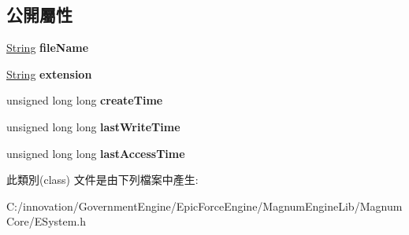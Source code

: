 \subsection*{公開屬性}
\begin{DoxyCompactItemize}
\item 
\hyperlink{class_i_dream_sky_1_1_string}{String} {\bfseries file\+Name}\hypertarget{class_i_dream_sky_1_1_system_1_1_file_a105074aa1f1a9c412714e5215bc9198f}{}\label{class_i_dream_sky_1_1_system_1_1_file_a105074aa1f1a9c412714e5215bc9198f}

\item 
\hyperlink{class_i_dream_sky_1_1_string}{String} {\bfseries extension}\hypertarget{class_i_dream_sky_1_1_system_1_1_file_a75aa8cc608dedfb4275596b81510a7d4}{}\label{class_i_dream_sky_1_1_system_1_1_file_a75aa8cc608dedfb4275596b81510a7d4}

\item 
unsigned long long {\bfseries create\+Time}\hypertarget{class_i_dream_sky_1_1_system_1_1_file_a0817d7e41722888abd6c15523970b580}{}\label{class_i_dream_sky_1_1_system_1_1_file_a0817d7e41722888abd6c15523970b580}

\item 
unsigned long long {\bfseries last\+Write\+Time}\hypertarget{class_i_dream_sky_1_1_system_1_1_file_a420ee50ae76893c08cb55af06aa2ea60}{}\label{class_i_dream_sky_1_1_system_1_1_file_a420ee50ae76893c08cb55af06aa2ea60}

\item 
unsigned long long {\bfseries last\+Access\+Time}\hypertarget{class_i_dream_sky_1_1_system_1_1_file_a43ec92674cae4a70167c42fe98910caa}{}\label{class_i_dream_sky_1_1_system_1_1_file_a43ec92674cae4a70167c42fe98910caa}

\end{DoxyCompactItemize}


此類別(class) 文件是由下列檔案中產生\+:\begin{DoxyCompactItemize}
\item 
C\+:/innovation/\+Government\+Engine/\+Epic\+Force\+Engine/\+Magnum\+Engine\+Lib/\+Magnum\+Core/E\+System.\+h\end{DoxyCompactItemize}
